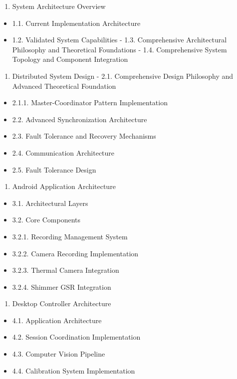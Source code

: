 \documentclass[11pt,a4paper]{report}
\begin{document}
\begin{enumerate}
\item System Architecture Overview
\end{enumerate}
\begin{itemize}
\item 1.1. Current Implementation Architecture
\item 1.2. Validated System Capabilities
    -
    1.3. Comprehensive Architectural Philosophy and Theoretical Foundations
    -
    1.4. Comprehensive System Topology and Component Integration
\end{itemize}
\begin{enumerate}
\item Distributed System Design
    -
    2.1. Comprehensive Design Philosophy and Advanced Theoretical Foundation
\end{enumerate}
\begin{itemize}
\item 2.1.1. Master-Coordinator Pattern Implementation
\item 2.2. Advanced Synchronization Architecture
\item 2.3. Fault Tolerance and Recovery Mechanisms
\item 2.4. Communication Architecture
\item 2.5. Fault Tolerance Design
\end{itemize}
\begin{enumerate}
\item Android Application Architecture
\end{enumerate}
\begin{itemize}
\item 3.1. Architectural Layers
\item 3.2. Core Components
\item 3.2.1. Recording Management System
\item 3.2.2. Camera Recording Implementation
\item 3.2.3. Thermal Camera Integration
\item 3.2.4. Shimmer GSR Integration
\end{itemize}
\begin{enumerate}
\item Desktop Controller Architecture
\end{enumerate}
\begin{itemize}
\item 4.1. Application Architecture
\item 4.2. Session Coordination Implementation
\item 4.3. Computer Vision Pipeline
\item 4.4. Calibration System Implementation
\end{itemize}
\end{document}
